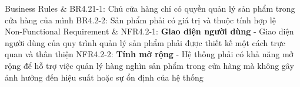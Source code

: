 \begin{usecase_table}
                    \hline
                    Business Rules	& BR4.21-1: Chủ cửa hàng chỉ có quyền quản lý sản phẩm trong cửa hàng của mình\newline
                    BR4.2-2: Sản phẩm phải có giá trị và thuộc tính hợp lệ\\
                    \hline
                    Non-Functional Requirement & NFR4.2-1: \textbf{Giao diện người dùng} - Giao diện người dùng của quy trình quản lý sản phẩm phải được thiết kế một cách trực quan và thân thiện
                    \newline
                    NFR4.2-2: \textbf{Tính mở rộng} - Hệ thống phải có khả năng mở rộng để hỗ trợ việc quản lý hàng nghìn sản phẩm trong cửa hàng mà không gây ảnh hưởng đến hiệu suất hoặc sự ổn định của hệ thống
                    \\
                    \hline
                \end{usecase_table}  
